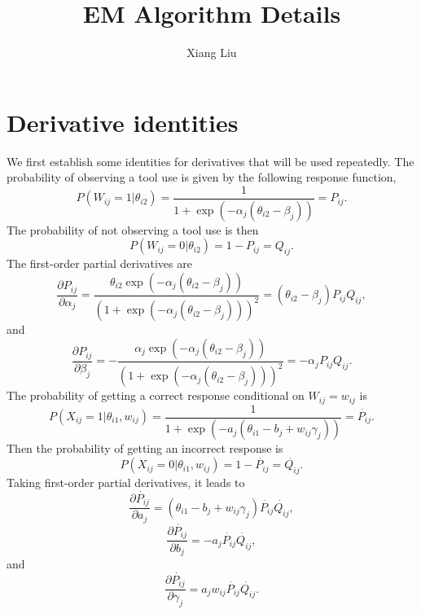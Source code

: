 \documentclass[doc]{apa7}
\title{EM Algorithm Details}
\author{Xiang Liu}
\affiliation{Educational Testing Service}
\begin{document}
\maketitle
	\section{Derivative identities}
	We first establish some identities for derivatives that will be used
  repeatedly.
  The probability of observing a tool use is given by the following response
  function,
  \begin{equation}
    P(W_{ij} = 1 | \theta_{i2}) = \frac{1}{1 + \exp(-\alpha_j
    (\theta_{i2} - \beta_j))} = P_{ij}.
  \end{equation}
  The probability of not observing a tool use is then 
  \begin{equation}
    P(W_{ij} = 0 | \theta_{i2}) = 1 - P_{ij} = Q_{ij}.
  \end{equation}
  The first-order partial derivatives are 
  \begin{equation}
    \frac{\partial P_{ij}}{\partial \alpha_j} = \frac{\theta_{i2}\exp(-\alpha_j
    (\theta_{i2}-\beta_j))}{(1+\exp(-\alpha_j(\theta_{i2}-\beta_j)))^2} =
    (\theta_{i2}-\beta_j) P_{ij} Q_{ij},
  \end{equation}
  and
  \begin{equation}
    \frac{\partial P_{ij}}{\partial \beta_j} = -\frac{\alpha_j\exp(-\alpha_j
    (\theta_{i2}-\beta_j))}{(1+\exp(-\alpha_j(\theta_{i2}-\beta_j)))^2} =
    -\alpha_j P_{ij} Q_{ij}.
  \end{equation}
  The probability of getting a correct response conditional on $W_{ij} = w_{ij}$
  is
  \begin{equation}
    P(X_{ij} = 1 | \theta_{i1}, w_{ij}) = \frac{1}{1 + \exp(-a_j (\theta_{i1} -
    b_j + w_{ij} \gamma_j))} = \dot{P_{ij}}.
  \end{equation}
  Then the probability of getting an incorrect response is
  \begin{equation}
    P(X_{ij} = 0 | \theta_{i1}, w_{ij}) = 1 - \dot{P_{ij}} = \dot{Q_{ij}}.
  \end{equation}
  Taking first-order partial derivatives, it leads to
  \begin{equation}
    \frac{\partial \dot{P_{ij}}}{\partial a_j} = (\theta_{i1}-b_j+w_{ij}\gamma_j)
    \dot{P_{ij}}\dot{Q_{ij}},
  \end{equation}
  \begin{equation}
    \frac{\partial \dot{P_{ij}}}{\partial b_j} = -a_j\dot{P_{ij}}\dot{Q_{ij}},
  \end{equation}
  and
  \begin{equation}
    \frac{\partial \dot{P_{ij}}}{\partial \gamma_j} = a_jw_{ij}\dot{P_{ij}}
    {\dot{Q_{ij}}}.
  \end{equation}
\end{document}
